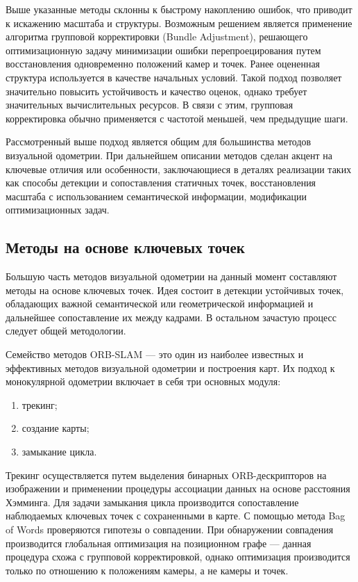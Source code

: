 Выше указанные методы склонны к быстрому накоплению ошибок, что приводит к искажению 
масштаба и структуры. Возможным решением является применение алгоритма групповой корректировки
(Bundle Adjustment), решающего оптимизационную задачу минимизации ошибки перепроецирования 
путем восстановления одновременно положений камер и точек. Ранее оцененная структура
используется в качестве начальных условий. Такой подход позволяет значительно повысить
устойчивость и качество оценок, однако требует значительных вычислительных ресурсов. 
В связи с этим, групповая корректировка обычно применяется с частотой меньшей, чем предыдущие
шаги.

Рассмотренный выше подход является общим для большинства методов визуальной одометрии. 
При дальнейшем описании методов
сделан акцент на ключевые отличия или особенности, заключающиеся в 
деталях реализации таких как способы детекции и сопоставления статичных точек, 
восстановления масштаба с использованием семантической информации, модификации 
оптимизационных задач.

\subsection{Методы на основе ключевых точек}
Большую часть методов визуальной одометрии на данный момент составляют методы на 
основе ключевых точек. Идея состоит в детекции устойчивых точек, обладающих важной 
семантической или геометрической информацией и дальнейшее сопоставление их 
между кадрами. В остальном зачастую процесс следует общей методологии. 

Семейство методов ORB-SLAM --- это один из наиболее известных и эффективных методов визуальной 
одометрии и построения карт. Их подход к монокулярной одометрии включает в себя три основных модуля: 
\begin{enumerate}
    \item трекинг;
    \item создание карты;
    \item замыкание цикла.
\end{enumerate}
Трекинг осуществляется путем выделения бинарных ORB-дескрипторов на изображении и применении 
процедуры ассоциации данных на основе расстояния Хэмминга. Для задачи замыкания
цикла производится сопоставление наблюдаемых ключевых точек с сохраненными в карте.
С помощью метода Bag of Words проверяются гипотезы о совпадении. При обнаружении совпадения
производится глобальная оптимизация на позиционном графе --- данная процедура схожа с 
групповой корректировкой, однако оптимизация производится только по отношению к
положениям камеры, а не камеры и точек.

